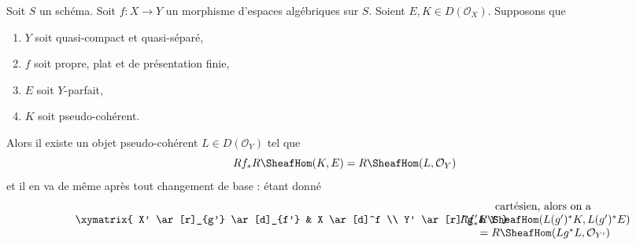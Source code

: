 \begin{lemma}
\label{lemma-compute-ext-rel-perfect}
Soit $S$ un schéma.
Soit $f : X \to Y$ un morphisme d'espaces algébriques sur $S$.
Soient $E, K \in D(\mathcal{O}_X)$.
Supposons que
\begin{enumerate}
\item $Y$ soit quasi-compact et quasi-séparé,
\item $f$ soit propre, plat et de présentation finie,
\item $E$ soit $Y$-parfait,
\item $K$ soit pseudo-cohérent.
\end{enumerate}
Alors il existe un objet pseudo-cohérent $L \in D(\mathcal{O}_Y)$ tel que
$$
Rf_*R\SheafHom(K, E) = R\SheafHom(L, \mathcal{O}_Y)
$$
et il en va de même après tout changement de base : étant donné
$$
\vcenter{
\xymatrix{
X' \ar[r]_{g'} \ar[d]_{f'} &
X \ar[d]^f \\
Y' \ar[r]^g &
Y
}
}
\quad\quad
\begin{matrix}
\text{cartésien, alors on a } \\
Rf'_*R\SheafHom(L(g')^*K, L(g')^*E) \\
= R\SheafHom(Lg^*L, \mathcal{O}_{Y'})
\end{matrix}
$$
\end{lemma}

